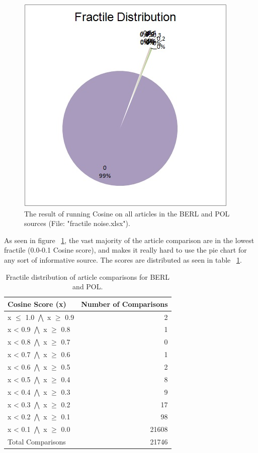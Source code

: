 \begin{figure}
	\centering
	\includegraphics[scale=1.0]{figures/FractileNoise}
	\caption{The result of running Cosine on all articles in the BERL and POL sources (File: "fractile noise.xlsx").}
	\label{FractileNoise}
\end{figure}

As seen in figure ~\ref{FractileNoise}, the vast majority of the article comparison are in the lowest fractile (0.0-0.1 Cosine score), and makes it really hard to use the pie chart for any sort of informative source. The scores are distributed as seen in table ~\ref{TestFractile}.

\begin{table}
\begin{center}
	\begin{tabular}{l | r}
		Cosine Score (x) & Number of Comparisons\\ \hline
		x $\leq$ 1.0 $\bigwedge$ x $\geq$ 0.9 & 2 \\ \hline
		x < 0.9 $\bigwedge$ x $\geq$ 0.8 & 1 \\ \hline
		x < 0.8 $\bigwedge$ x $\geq$ 0.7 & 0 \\ \hline
		x < 0.7 $\bigwedge$ x $\geq$ 0.6 & 1 \\ \hline
		x < 0.6 $\bigwedge$ x $\geq$ 0.5 & 2 \\ \hline
		x < 0.5 $\bigwedge$ x $\geq$ 0.4 & 8 \\ \hline
		x < 0.4 $\bigwedge$ x $\geq$ 0.3 & 9 \\ \hline
		x < 0.3 $\bigwedge$ x $\geq$ 0.2 & 17 \\ \hline
		x < 0.2 $\bigwedge$ x $\geq$ 0.1 & 98 \\ \hline
		x < 0.1 $\bigwedge$ x $\geq$ 0.0 & 21608 \\ \hline	
		Total Comparisons & 21746 \\ \hline
	\end{tabular}
\end{center}
\caption{Fractile distribution of article comparisons for BERL and POL.}\label{TestFractile}
\end{table}

